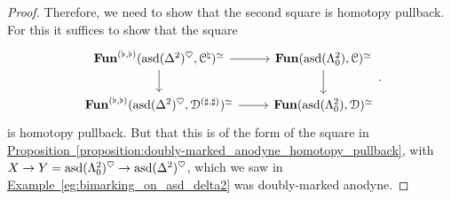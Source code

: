 \documentclass[main.tex]{subfiles}
\begin{document}
\begin{proof}
  Therefore, we need to show that the second square is homotopy pullback. For this it suffices to show that the square
  \begin{equation*}
    \begin{tikzcd}
      \Fun^{(\flat, \flat)}(\asd(\Delta^{2})^{\heartsuit}, \category{C}^{\natural})^{\simeq}
      \arrow[r]
      \arrow[d]
      & \Fun(\asd(\Lambda^{2}_{0}), \category{C})^{\simeq}
      \arrow[d]
      \\
      \Fun^{(\flat, \flat)}(\asd(\Delta^{2})^{\heartsuit}, \category{D}^{(\sharp, \sharp)})^{\simeq}
      \arrow[r]
      & \Fun(\asd(\Lambda^{2}_{0}), \category{D})^{\simeq}
    \end{tikzcd}.
  \end{equation*}
  is homotopy pullback. But that this is of the form of the square in \hyperref[proposition:doubly-marked_anodyne_homotopy_pullback]{Proposition~\ref*{proposition:doubly-marked_anodyne_homotopy_pullback}}, with $X \to Y = \mathrm{asd}(\Lambda^{2}_{0})^{\heartsuit} \to \mathrm{asd}(\Delta^{2})^{\heartsuit}$, which we saw in \hyperref[eg:bimarking_on_asd_delta2]{Example~\ref*{eg:bimarking_on_asd_delta2}} was doubly-marked anodyne.
\end{proof}
\end{document}
